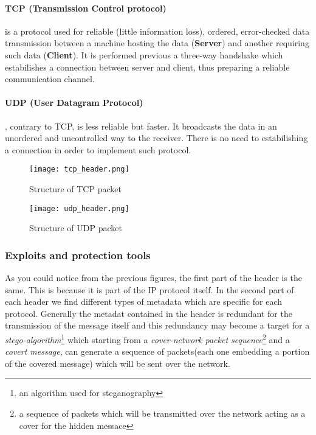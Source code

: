 \documentclass[../../main.tex]{subfiles}
\begin{document}
    \paragraph{TCP (Transmission Control protocol)} is a protocol used for
    reliable (little information loss), ordered, error-checked data transmission
    between a machine hosting the data (\textbf{Server}) and another requiring
    such data (\textbf{Client}). It is performed previous a three-way handshake
    which estabilishes a connection between server and client, thus preparing a
    reliable communication channel.

    \paragraph{UDP (User Datagram Protocol)}, contrary to TCP, is less reliable
    but faster.
    It broadcasts the data in an unordered and uncontrolled way to the receiver. 
    There is no need to estabilishing a connection in order to implement such
    protocol.

    \begin{figure}[h]
        \centering
        \caption{Structure of TCP packet}
        \texttt{[image: tcp\_header.png]}
    \end{figure}

    \begin{figure}[h]
        \centering
        \caption{Structure of UDP packet}
        \texttt{[image: udp\_header.png]}
    \end{figure}

    \subsubsection{Exploits and protection tools}

    As you could notice from the previous figures, the first part of the header
    is the same. This is because it is part of the IP protocol itself.
    In the second part of each header we find different types of metadata which
    are specific for each protocol. Generally the metadat contained in the
    header is redundant for the transmission of the message itself and this 
    redundancy may become a target for a \emph{stego-algorithm}\footnote{an
    algorithm used for steganography} which starting from a \emph{cover-network
    packet sequence}\footnote{a sequence of packets which will be transmitted
    over the network acting as a cover for the hidden messace} and a
    \emph{covert message}, can generate a sequence of packets(each one embedding
    a portion of the covered message) which will be sent over the network.
\end{document}
